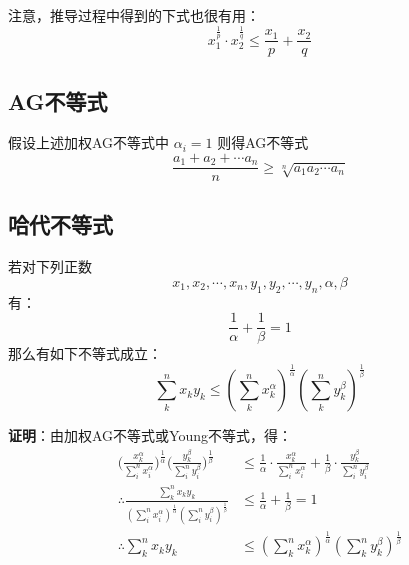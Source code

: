 \documentclass[12pt]{article}
\begin{document}
注意，推导过程中得到的下式也很有用：
$$
x_1^{\frac{1}{p}} \cdot  x_2^{\frac{1}{q}} \le \frac{x_1}{p} + \frac{x_2}{q}
$$

\subsection{AG不等式}
\begin{mdframed}[
linecolor=black!40,outerlinewidth=1pt,roundcorner=.5em,innertopmargin=1ex,innerbottommargin=.5\baselineskip,innerrightmargin=1em,innerleftmargin=1em,backgroundcolor=gray!5,
]
假设上述加权AG不等式中 $\alpha_i = 1$ 则得AG不等式
$$
\frac{a_1 + a_2 + \cdots a_n}{n} \ge \sqrt[n]{a_1a_2\cdots a_n}
$$
\end{mdframed}

\subsection{哈代不等式}
\begin{mdframed}[
linecolor=black!40,outerlinewidth=1pt,roundcorner=.5em,innertopmargin=1ex,innerbottommargin=.5\baselineskip,innerrightmargin=1em,innerleftmargin=1em,backgroundcolor=gray!5,
]
若对下列正数
$$
x_1, x_2, \cdots, x_n, y_1, y_2, \cdots, y_n, \alpha, \beta
$$
有：
$$
\frac{1}{\alpha} + \frac{1}{\beta}  = 1
$$
那么有如下不等式成立：
$$
\sum_k^nx_ky_k \le (\sum_k^nx_k^{\alpha})^{\frac{1}{\alpha}}(\sum_k^ny_k^{\beta})^{\frac{1}{\beta}} 
$$
\end{mdframed}
\textbf{证明}：由加权AG不等式或Young不等式，得：
\begin{align*}
\Big(\frac{x_k^{\alpha}}{\sum_i^nx_i^{\alpha}}\Big)^{\frac{1}{\alpha}}\Big(\frac{y_k^{\beta}}{\sum_i^ny_i^{\beta}}\Big)^{\frac{1}{\beta}} & \le \frac{1}{\alpha}\cdot\frac{x_k^{\alpha}}{\sum_i^nx_i^{\alpha}} + \frac{1}{\beta}\cdot\frac{y_k^{\beta}}{\sum_i^ny_i^{\beta}} \\
\therefore \frac{\sum_k^nx_ky_k}{(\sum_i^nx_i^{\alpha})^{\frac{1}{\alpha}}(\sum_i^ny_i^{\beta})^{\frac{1}{\beta}}} &\le \frac{1}{\alpha} + \frac{1}{\beta} = 1 \\
\therefore \sum_k^nx_ky_k &\le (\sum_k^nx_k^{\alpha})^{\frac{1}{\alpha}}(\sum_k^ny_k^{\beta})^{\frac{1}{\beta}} 
\end{align*}
\end{document}
